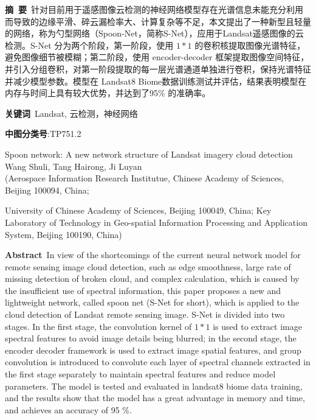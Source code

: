 \documentclass[10pt,UTF8,fntef]{ctexart}
\begin{document}
\setlength{\columnsep}{25pt} 
\date{}


\maketitle
\pagestyle{empty} %
\thispagestyle{empty} %
\noindent\textbf{摘\ 要}\ 针对目前用于遥感图像云检测的神经网络模型存在光谱信息未能充分利用而导致的边缘平滑、碎云漏检率大、计算复杂等不足，本文提出了一种新型且轻量的网络，称为勺型网络（Spoon-Net，简称S-Net），应用于Landsat遥感图像的云检测。S-Net 分为两个阶段，第一阶段，使用 $1*1$ 的卷积核提取图像光谱特征，避免图像细节被模糊；第二阶段，使用 encoder-decoder 框架提取图像空间特征，并引入分组卷积，对第一阶段提取的每一层光谱通道单独进行卷积，保持光谱特征并减少模型参数。模型在 Landsat8 Biome数据训练测试并评估，结果表明模型在内存与时间上具有较大优势，并达到了95\% 的准确率。

\noindent\textbf{关键词}\ Landsat, 云检测，神经网络

\noindent\textbf{中图分类号}:TP751.2

\begin{center}
    \Large
    Spoon network: A new network structure of Landsat imagery cloud detection
    \\[10pt]
    \normalsize 
    Wang Shuli, Tang Hairong, Ji Luyan
    \\[8pt]
    \small
    (Aerospace Information Research Institutue, Chinese Academy of Sciences, Beijing 100094, China;
    
    University of Chinese Academy of Sciences, Beijing 100049, China; Key Laboratory of Technology in Geo-spatial Information Processing and Application System, Beijing 100190, China)
\end{center}

\noindent\textbf{Abstract}\ In view of the shortcomings of the current neural network model for remote sensing image cloud detection, such as edge smoothness, large rate of missing detection of broken cloud, and complex calculation, which is caused by the insufficient use of spectral information, this paper proposes a new and lightweight network, called spoon net (S-Net for short), which is applied to the cloud detection of Landsat remote sensing image. S-Net is divided into two stages. In the first stage, the convolution kernel of $1 * 1 $ is used to extract image spectral features to avoid image details being blurred; in the second stage, the encoder decoder framework is used to extract image spatial features, and group convolution is introduced to convolute each layer of spectral channels extracted in the first stage separately to maintain spectral features and reduce model parameters. The model is tested and evaluated in landsat8 biome data training, and the results show that the model has a great advantage in memory and time, and achieves an accuracy of 95 \%.
\end{document}
